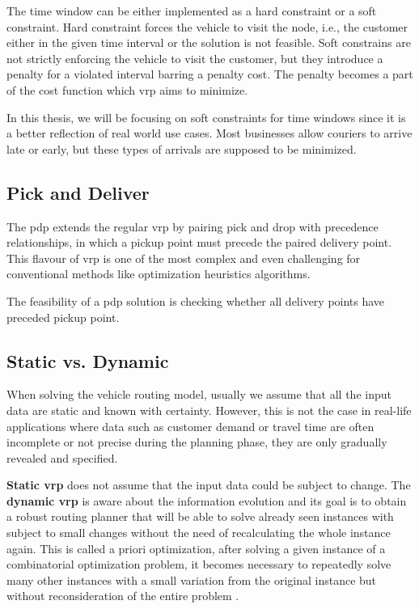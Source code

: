     The time window can be either implemented as a hard constraint or a soft constraint. Hard constraint forces the vehicle to visit the node, i.e., the customer either in the given time interval or the solution is not feasible. Soft constrains are not strictly enforcing the vehicle to visit the customer, but they introduce a penalty for a violated interval barring a penalty cost. The penalty becomes a part of the cost function which \gls{vrp} aims to minimize.
    
    In this thesis, we will be focusing on soft constraints for time windows since it is a better reflection of real world use cases. Most businesses allow couriers to arrive late or early, but these types of arrivals are supposed to be minimized.
    
    \subsection{Pick and Deliver}\label{pick-and-delivery}
    The \gls{pdp} extends the regular \gls{vrp} by pairing pick and drop with precedence relationships, in which a pickup point must precede the paired delivery point. This flavour of \gls{vrp} is one of the most complex and even challenging for conventional methods like optimization heuristics algorithms.
    
    The feasibility of a \gls{pdp} solution is checking whether all delivery points have preceded pickup point.
    
    \subsection{Static vs. Dynamic}\label{dynamic}
    When solving the vehicle routing model, usually we assume that all the input data are static and known with certainty. However, this is not the case in real-life applications where data such as customer demand or travel time are often incomplete or not precise during the planning phase, they are only gradually revealed and specified.
    
    \textbf{Static \gls{vrp}} does not assume that the input data could be subject to change. The \textbf{dynamic \gls{vrp}} is aware about the information evolution\cite{psaraftis} and its goal is to obtain a robust routing planner that will be able to solve already seen instances with subject to small changes without the need of recalculating the whole instance again. This is called a priori optimization, after solving a given instance of a combinatorial optimization problem, it becomes necessary to repeatedly solve many other instances with a small variation from the original instance but without reconsideration of the entire problem \cite{apriori-optimization}.
    
